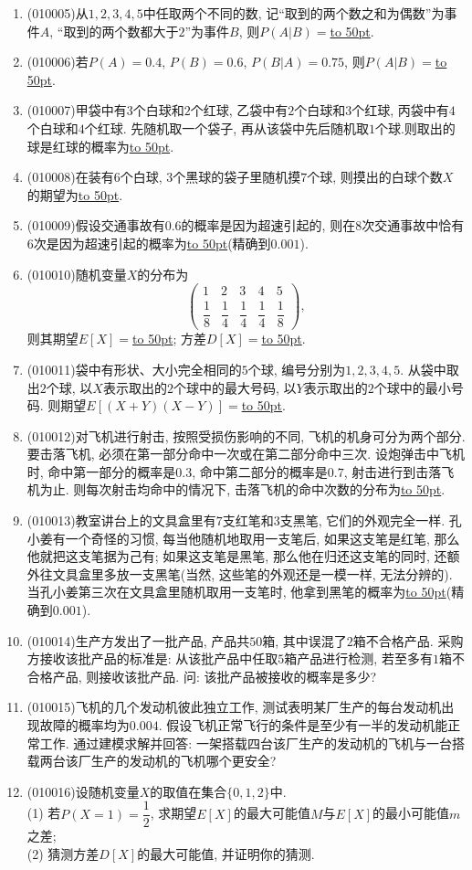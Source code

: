 \documentclass[10pt,a4paper]{article}
\newcommand{\blank}[1]{\underline{\hbox to #1pt{}}}
\begin{document}
\begin{enumerate}[1.]

\item {\tiny (010005)}从$1,2,3,4,5$中任取两个不同的数, 记``取到的两个数之和为偶数''为事件$A$, ``取到的两个数都大于$2$''为事件$B$, 则$P(A|B)=$\blank{50}.
\item {\tiny (010006)}若$P(A)=0.4$, $P(B)=0.6$, $P(B|A)=0.75$, 则$P(A|B)=$\blank{50}.
\item {\tiny (010007)}甲袋中有$3$个白球和$2$个红球, 乙袋中有$2$个白球和$3$个红球, 丙袋中有$4$个白球和$4$个红球. 先随机取一个袋子, 再从该袋中先后随机取$1$个球.则取出的球是红球的概率为\blank{50}.
\item {\tiny (010008)}在装有$6$个白球, $3$个黑球的袋子里随机摸$7$个球, 则摸出的白球个数$X$的期望为\blank{50}.
\item {\tiny (010009)}假设交通事故有$0.6$的概率是因为超速引起的, 则在$8$次交通事故中恰有$6$次是因为超速引起的概率为\blank{50}(精确到$0.001$).
\item {\tiny (010010)}随机变量$X$的分布为
\[\begin{pmatrix} 1 & 2 & 3 & 4 & 5 \\ \dfrac 18 & \dfrac 14 & \dfrac 14 & \dfrac 14 & \dfrac 18\end{pmatrix},\]
则其期望$E[X]=$\blank{50}; 方差$D[X]=$\blank{50}.
\item {\tiny (010011)}袋中有形状、大小完全相同的$5$个球, 编号分别为$1,2,3,4,5$. 从袋中取出$2$个球, 以$X$表示取出的$2$个球中的最大号码, 以$Y$表示取出的$2$个球中的最小号码. 则期望$E[(X+Y)(X-Y)]=$\blank{50}.
\item {\tiny (010012)}对飞机进行射击, 按照受损伤影响的不同, 飞机的机身可分为两个部分. 要击落飞机, 必须在第一部分命中一次或在第二部分命中三次. 设炮弹击中飞机时, 命中第一部分的概率是$0.3$, 命中第二部分的概率是$0.7$, 射击进行到击落飞机为止. 则每次射击均命中的情况下, 击落飞机的命中次数的分布为\blank{50}.
\item {\tiny (010013)}教室讲台上的文具盒里有$7$支红笔和$3$支黑笔, 它们的外观完全一样. 孔小姜有一个奇怪的习惯, 每当他随机地取用一支笔后, 如果这支笔是红笔, 那么他就把这支笔据为己有; 如果这支笔是黑笔, 那么他在归还这支笔的同时, 还额外往文具盒里多放一支黑笔(当然, 这些笔的外观还是一模一样, 无法分辨的). 当孔小姜第三次在文具盒里随机取用一支笔时, 他拿到黑笔的概率为\blank{50}(精确到$0.001$).
\item {\tiny (010014)}生产方发出了一批产品, 产品共$50$箱, 其中误混了$2$箱不合格产品. 采购方接收该批产品的标准是: 从该批产品中任取$5$箱产品进行检测, 若至多有$1$箱不合格产品, 则接收该批产品. 问: 该批产品被接收的概率是多少?
\item {\tiny (010015)}飞机的几个发动机彼此独立工作, 测试表明某厂生产的每台发动机出现故障的概率均为$0.004$. 假设飞机正常飞行的条件是至少有一半的发动机能正常工作. 通过建模求解并回答: 一架搭载四台该厂生产的发动机的飞机与一台搭载两台该厂生产的发动机的飞机哪个更安全?
\item {\tiny (010016)}设随机变量$X$的取值在集合$\{0,1,2\}$中.\\
(1) 若$P(X=1)=\dfrac 12$, 求期望$E[X]$的最大可能值$M$与$E[X]$的最小可能值$m$之差;\\
(2) 猜测方差$D[X]$的最大可能值, 并证明你的猜测.
\end{enumerate}
\end{document}
